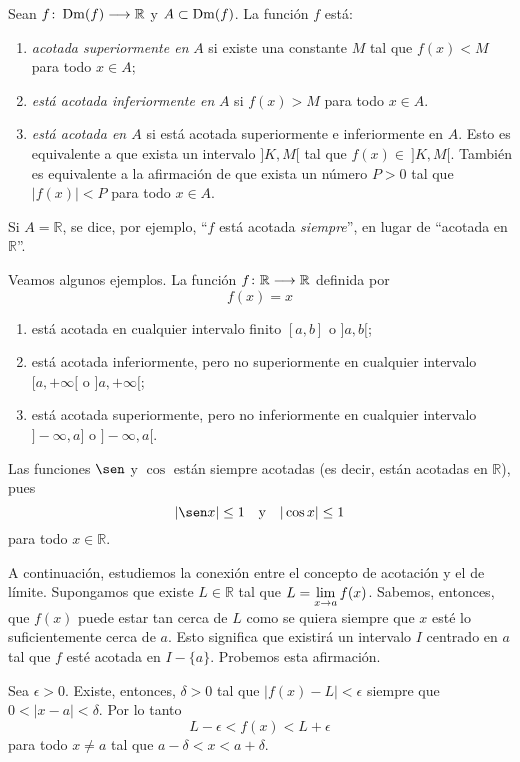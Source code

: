 \begin{defical}%
Sean $\funcjc{f}{\Dm(f)}{\mathbb{R}}$ y $A\subset \Dm(f)$. La función $f$ está:
\begin{enumerate}[leftmargin=*]
\item \emph{acotada superiormente en} $A$ si existe una constante $M$ tal que $f(x) < M$ para
    todo $x\in A$;

\item \emph{está acotada inferiormente en} $A$ si $f(x) > M$ para todo $x\in A$.

\item \emph{está acotada en $A$} si está acotada superiormente e inferiormente en $A$. Esto es equivalente a
    que exista un intervalo $]K,M[$ tal que $f(x) \in\ ]K,M[$. También es equivalente a la
    afirmación de que exista un número $P > 0$ tal que $|f(x)| < P$ para todo $x\in A$.
\end{enumerate}
Si $A = \mathbb{R}$, se dice, por ejemplo, ``$f$ está acotada \textit{siempre}'', en lugar de ``acotada en $\mathbb{R}$''.
\end{defical}

Veamos algunos ejemplos. La función $\funcjc{f}{\mathbb{R}}{\mathbb{R}}$ definida por
\[
f(x) = x
\]
\begin{enumerate}
\item está acotada en cualquier intervalo finito $[a,b]$ o $]a,b[$;
\item está acotada inferiormente, pero no superiormente en cualquier intervalo $[a,+\infty[$ o
    $]a,+\infty[$;
\item está acotada superiormente, pero no inferiormente en cualquier intervalo $]\!-\infty, a]$
    o $]\!-\infty,a[$.
\end{enumerate}

Las funciones $\sen$ y $\cos$ están siempre acotadas (es decir, están acotadas en $\mathbb{R}$), pues
\[
|\sen x| \leq 1 \yjc |\cos x| \leq 1
\]
para todo $x\in\mathbb{R}$.

A continuación, estudiemos la conexión entre el concepto de acotación y el de límite. Supongamos
que existe $L\in\mathbb{R}$ tal que $L = \displaystyle\limjc{f(x)}{x}{a}$. Sabemos, entonces, que
$f(x)$ puede estar tan cerca de $L$ como se quiera siempre que $x$ esté lo suficientemente cerca de
$a$. Esto significa que existirá un intervalo $I$ centrado en $a$ tal que $f$ esté acotada en $I -
\{a\}$. Probemos esta afirmación.

Sea $\epsilon > 0$. Existe, entonces, $\delta > 0$ tal que $|f(x) - L| < \epsilon$ siempre que $0 <
|x - a| < \delta$. Por lo tanto
\[
L -\epsilon < f(x) < L + \epsilon
\]
para todo $x\neq a$ tal que $a - \delta < x < a + \delta$.


